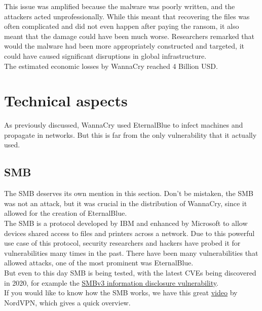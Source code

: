 This issue was amplified because the malware was poorly written, and the attackers acted unprofessionally.
While this meant that recovering the files was often complicated and did not even happen after paying the ransom, it also meant that the damage could have been much worse.
Researchers remarked that would the malware had been more appropriately constructed and targeted, it could have caused significant disruptions in global infrastructure.
\\

The estimated economic losses by WannaCry reached 4 Billion USD.

\section{Technical aspects}

As previously discussed, WannaCry used EternalBlue to infect machines and propagate in networks.
But this is far from the only vulnerability that it actually used.

\subsection{SMB}

The %
SMB deserves its own mention in this section.
Don't be mistaken, the %
SMB was not an attack, but it was crucial in the distribution of WannaCry, since it allowed for the creation of EternalBlue.
\\

The
 SMB is a protocol developed by IBM and enhanced by Microsoft to allow devices shared access to files and printers across a network.
Due to this powerful use case of this protocol, security researchers and hackers have probed it for vulnerabilities many times in the past.
There have been many vulnerabilities that allowed attacks, one of the most prominent was EternalBlue.
\\

But even to this day %
SMB is being tested, with the latest CVEs being discovered in 2020, for example the \href{https://nvd.nist.gov/vuln/detail/CVE-2020-1206}{SMBv3 information disclosure vulnerability}. 
\\

If you would like to know how the SMB works, we have this great \href{https://www.youtube.com/watch?v=csocwMe7l_E}{video} by NordVPN, which gives a quick overview.



